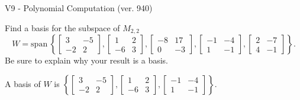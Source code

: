 \begin{exercise}
  \begin{exerciseTitle}V9 - Polynomial Computation (ver. 940)\end{exerciseTitle}
  \begin{exerciseStatement}
    Find a basis for the subspace of \(M_{2,2}\) 
\[W=\mathrm{span}\ \left\{\left[\begin{array}{cc}
3 & -5 \\
-2 & 2
\end{array}\right] , \left[\begin{array}{cc}
1 & 2 \\
-6 & 3
\end{array}\right] , \left[\begin{array}{cc}
-8 & 17 \\
0 & -3
\end{array}\right] , \left[\begin{array}{cc}
-1 & -4 \\
1 & -1
\end{array}\right] , \left[\begin{array}{cc}
2 & -7 \\
4 & -1
\end{array}\right]\right\}.\]
 Be sure to explain why your result is a basis.


  \end{exerciseStatement}
  \begin{exerciseAnswer}
   A basis of \(W\) is  \(\left\{\left[\begin{array}{cc}
3 & -5 \\
-2 & 2
\end{array}\right] , \left[\begin{array}{cc}
1 & 2 \\
-6 & 3
\end{array}\right] , \left[\begin{array}{cc}
-1 & -4 \\
1 & -1
\end{array}\right]\right\}\).
  


  \end{exerciseAnswer}
\end{exercise}